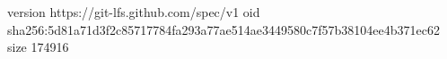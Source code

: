 version https://git-lfs.github.com/spec/v1
oid sha256:5d81a71d3f2c85717784fa293a77ae514ae3449580c7f57b38104ee4b371ec62
size 174916

